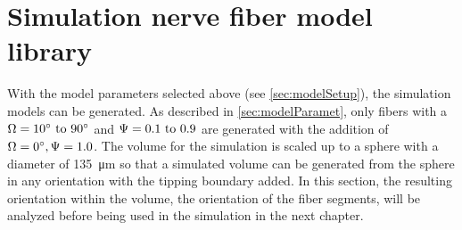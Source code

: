 \section{Simulation nerve fiber model library}
%
With the model parameters selected above (see \cref{sec:modelSetup}), the simulation models can be generated.
As described in \cref{sec:modelParamet}, only fibers with a $\modelOmega = \SIrange{10}{90}{\degree}$ and $\modelPsi = \SIrange{0.1}{0.9}{}$ are generated with the addition of $\textnormal{$\Omega$}=\SI{0}{\degree}, \textnormal{$\Psi$}=\SI{1.0}{}$.
The volume for the simulation is scaled up to a sphere with a diameter of \SI{135}{\micro\meter} so that a simulated volume can be generated from the sphere in any orientation with the tipping boundary added.
In this section, the resulting orientation within the volume, \ie{} the orientation of the fiber segments, will be analyzed before being used in the simulation in the next chapter.
%
%
%
